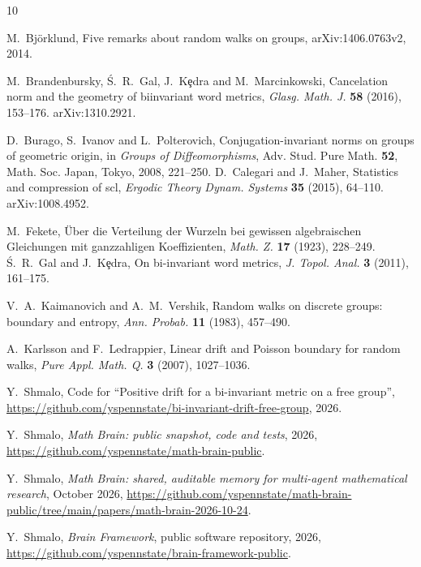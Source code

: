 \documentclass[11pt]{amsart}
\theoremstyle{definition}
\theoremstyle{remark}
\numberwithin{equation}{section}
\begin{document}
\begin{thebibliography}{10}

M.~Bj\"orklund, Five remarks about random walks on groups, arXiv:1406.0763v2, 2014.

M.~Brandenbursky, \'S.~R.~Gal, J.~K\c{e}dra and M.~Marcinkowski, Cancelation norm and the geometry of biinvariant word metrics, \emph{Glasg. Math. J.} \textbf{58} (2016), 153--176. arXiv:1310.2921.

D.~Burago, S.~Ivanov and L.~Polterovich, Conjugation-invariant norms on groups of geometric origin, in \emph{Groups of Diffeomorphisms}, Adv. Stud. Pure Math. \textbf{52}, Math. Soc. Japan, Tokyo, 2008, 221--250.
D.~Calegari and J.~Maher, Statistics and compression of scl, \emph{Ergodic Theory Dynam. Systems} \textbf{35} (2015), 64--110. arXiv:1008.4952.

M.~Fekete, \"Uber die Verteilung der Wurzeln bei gewissen algebraischen Gleichungen mit ganzzahligen Koeffizienten, \emph{Math. Z.} \textbf{17} (1923), 228--249.
\'S.~R.~Gal and J.~K\c{e}dra, On bi-invariant word metrics, \emph{J. Topol. Anal.} \textbf{3} (2011), 161--175.

V.~A.~Kaimanovich and A.~M.~Vershik, Random walks on discrete groups: boundary and entropy, \emph{Ann. Probab.} \textbf{11} (1983), 457--490.

A.~Karlsson and F.~Ledrappier, Linear drift and Poisson boundary for random walks, \emph{Pure Appl. Math. Q.} \textbf{3} (2007), 1027--1036.

Y.~Shmalo, Code for ``Positive drift for a bi-invariant metric on a free group'', \url{https://github.com/yspennstate/bi-invariant-drift-free-group}, 2026.

 Y.~Shmalo, \emph{Math Brain: public snapshot, code and tests}, 2026, \url{https://github.com/yspennstate/math-brain-public}.

 Y.~Shmalo, \emph{Math Brain: shared, auditable memory for multi-agent mathematical research}, October 2026, \url{https://github.com/yspennstate/math-brain-public/tree/main/papers/math-brain-2026-10-24}.

 Y.~Shmalo, \emph{Brain Framework}, public software repository, 2026, \url{https://github.com/yspennstate/brain-framework-public}.

\end{thebibliography}
\end{document}
